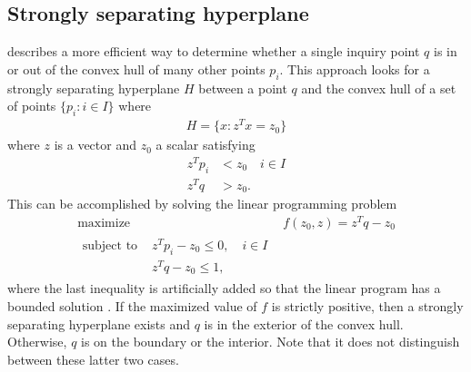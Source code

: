 \subsection{Strongly separating hyperplane} \label{S:Strong H}
\citet{Fukuda:2008} describes a more efficient way to determine whether a single 
inquiry point $q$ is in or out of the convex hull of many other points $p_i$.  
This approach looks for a strongly separating hyperplane $H$ between a 
point $q$ and the convex hull of a set of points $\{p_i : i \in I\}$ where
\begin{align*}
	H = \{x : z^T x = z_0\}
\end{align*}
where $z$ is a vector and $z_0$ a scalar satisfying
\begin{align*}
		z^T p_i &< z_0 \quad i \in I \\
		z^Tq &> z_0.
\end{align*}
This can be accomplished by solving the linear programming problem
\begin{align}
	\text{maximize } 	&f(z_0, z) = z^Tq - z_0 \label{E:Hyperplane objv}\\  
	\begin{split}
	\text{subject to } 	&z^T p_i - z_0 \leq 0, \quad i \in I \label{E:Hyperplane Hrep}\\ 
						&z^Tq - z_0 \leq 1, 
	\end{split}
\end{align}
where the last inequality is artificially added so that the linear program 
has a bounded solution \citep{Fukuda:2008,rcdd:R}.  If the maximized value of 
$f$ is strictly positive, then a strongly separating hyperplane exists and 
$q$ is in the exterior of the convex hull.  Otherwise, $q$ is on the boundary or 
the interior.  Note that it does not distinguish between these latter two cases.


